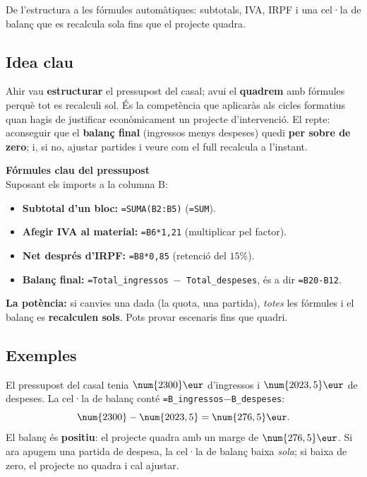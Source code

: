 %
{De l'estructura a les fórmules automàtiques: subtotals, IVA, IRPF i una cel·la de balanç que es recalcula sola fins que el projecte quadra.}

\subsection{Idea clau}

Ahir vau \textbf{estructurar} el pressupost del casal; avui el \textbf{quadrem} amb
fórmules perquè tot es recalculi sol. És la competència que aplicaràs als cicles
formatius quan hagis de justificar econòmicament un projecte d'intervenció. El repte:
aconseguir que el \textbf{balanç final} (ingressos menys despeses) quedi \textbf{per
sobre de zero}; i, si no, ajustar partides i veure com el full recalcula a l'instant.

\begin{idea}
\textbf{Fórmules clau del pressupost}\\
Suposant els imports a la columna B:
\begin{itemize}[leftmargin=1.4em, itemsep=2pt]
  \item \textbf{Subtotal d'un bloc:} \texttt{=SUMA(B2:B5)} (\texttt{=SUM}).
  \item \textbf{Afegir IVA al material:} \texttt{=B6*1,21} (multiplicar pel factor).
  \item \textbf{Net després d'IRPF:} \texttt{=B8*0,85} (retenció del $15\%$).
  \item \textbf{Balanç final:} \texttt{=Total\_ingressos\,$-$\,Total\_despeses}, és a
        dir \texttt{=B20-B12}.
\end{itemize}
\textbf{La potència:} si canvies una dada (la quota, una partida), \emph{totes} les
fórmules i el balanç es \textbf{recalculen sols}. Pots provar escenaris fins que
quadri.
\end{idea}

\subsection{Exemples}

\begin{exemple}
El pressupost del casal tenia $\num{2300}\eur$ d'ingressos i $\num{2023,5}\eur$ de
despeses. La cel·la de balanç conté \texttt{=B\_ingressos$-$B\_despeses}:
\[
\num{2300}-\num{2023,5}=\num{276,5}\eur.
\]
El balanç és \textbf{positiu}: el projecte quadra amb un marge de $\num{276,5}\eur$.
Si ara apugem una partida de despesa, la cel·la de balanç baixa \emph{sola}; si baixa
de zero, el projecte no quadra i cal ajustar.
\end{exemple}

